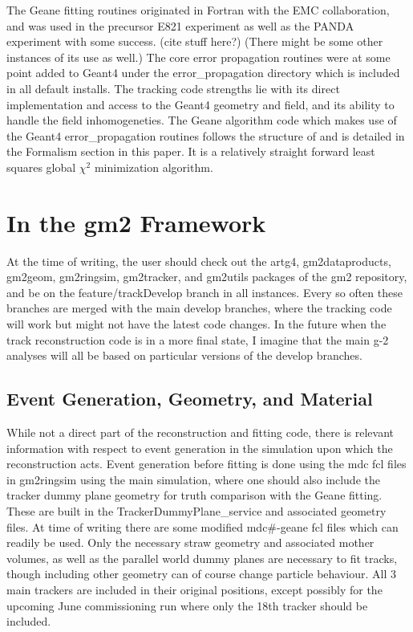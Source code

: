 \documentclass{article}
\begin{document}
  The Geane fitting routines originated in Fortran with the EMC collaboration, and was used in the precursor E821 experiment as well as the PANDA experiment with some success. (cite stuff here?) (There might be some other instances of its use as well.) The core error propagation routines were at some point added to Geant4 under the error\_propagation directory which is included in all default installs. The tracking code strengths lie with its direct implementation and access to the Geant4 geometry and field, and its ability to handle the field inhomogeneties. The Geane algorithm code which makes use of the Geant4 error\_propagation routines follows the structure of \cite{geanemanual} and is detailed in the Formalism section in this paper. It is a relatively straight forward least squares global $\chi^{2}$ minimization algorithm. 





\section{In the gm2 Framework}

  At the time of writing, the user should check out the artg4, gm2dataproducts, gm2geom, gm2ringsim, gm2tracker, and gm2utils packages of the gm2 repository, and be on the feature/trackDevelop branch in all instances. Every so often these branches are merged with the main develop branches, where the tracking code will work but might not have the latest code changes. In the future when the track reconstruction code is in a more final state, I imagine that the main g-2 analyses will all be based on particular versions of the develop branches.

  \subsection{Event Generation, Geometry, and Material}

    While not a direct part of the reconstruction and fitting code, there is relevant information with respect to event generation in the simulation upon which the reconstruction acts. Event generation before fitting is done using the mdc fcl files in gm2ringsim using the main simulation, where one should also include the tracker dummy plane geometry for truth comparison with the Geane fitting. These are built in the TrackerDummyPlane\_service and associated geometry files. At time of writing there are some modified mdc\#-geane fcl files which can readily be used. Only the necessary straw geometry and associated mother volumes, as well as the parallel world dummy planes are necessary to fit tracks, though including other geometry can of course change particle behaviour. All 3 main trackers are included in their original positions, except possibly for the upcoming June commissioning run where only the 18th tracker should be included. 
\end{document}
